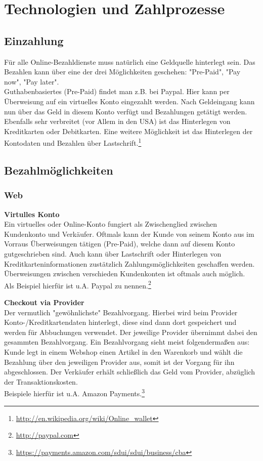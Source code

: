 \section{Technologien und Zahlprozesse}

\subsection{Einzahlung}
Für alle Online-Bezahldienste muss natürlich eine Geldquelle hinterlegt sein. Das Bezahlen kann über eine der drei Möglichkeiten geschehen: "Pre-Paid", "Pay now", "Pay later".\\
Guthabenbasiertes (Pre-Paid) findet man z.B. bei Paypal. Hier kann per Überweisung auf ein virtuelles Konto eingezahlt werden. Nach Geldeingang kann nun über das Geld in diesem Konto verfügt und Bezahlungen getätigt werden.
Ebenfalls sehr verbreitet (vor Allem in den USA) ist das Hinterlegen von Kreditkarten oder Debitkarten. Eine weitere Möglichkeit ist das Hinterlegen der Kontodaten und Bezahlen über Lastschrift.\footnote{\url{http://en.wikipedia.org/wiki/Online_wallet}}

\subsection{Bezahlmöglichkeiten}
\subsubsection{Web}
\textbf{Virtulles Konto}\\
Ein virtuelles oder Online-Konto fungiert als Zwischenglied zwischen Kundenkonto und Verkäufer. Oftmals kann der Kunde von seinem Konto aus im Vorraus Überweisungen tätigen (Pre-Paid), welche dann auf diesem Konto gutgeschrieben sind. Auch kann über Lastschrift oder Hinterlegen von Kreditkarteninformationen zustätzlich Zahlungsmöglichkeiten geschaffen werden.\\
Überweisungen zwischen verschieden Kundenkonten ist oftmals auch möglich.\\
Als Beispiel hierfür ist u.A. Paypal zu nennen.\footnote{\url{http://paypal.com}}

\textbf{Checkout via Provider}\\
Der vermutlich "gewöhnlichste" Bezahlvorgang. Hierbei wird beim Provider Konto-/Kreditkartendaten hinterlegt, diese sind dann dort gespeichert und werden für Abbuchungen verwendet.
Der jeweilige Provider übernimmt dabei den gesammten Bezahlvorgang. Ein Bezahlvorgang sieht meist folgendermaßen aus: Kunde legt in einem Webshop einen Artikel in den Warenkorb und wählt die Bezahlung über den jeweiligen Provider aus, somit ist der Vorgang für ihn abgeschlossen. Der Verkäufer erhält schließlich das Geld vom Provider, abzüglich der Transaktionskosten.\\
Beispiele hierfür ist u.A. Amazon Payments.\footnote{\url{https://payments.amazon.com/sdui/sdui/business/cba}}\\

